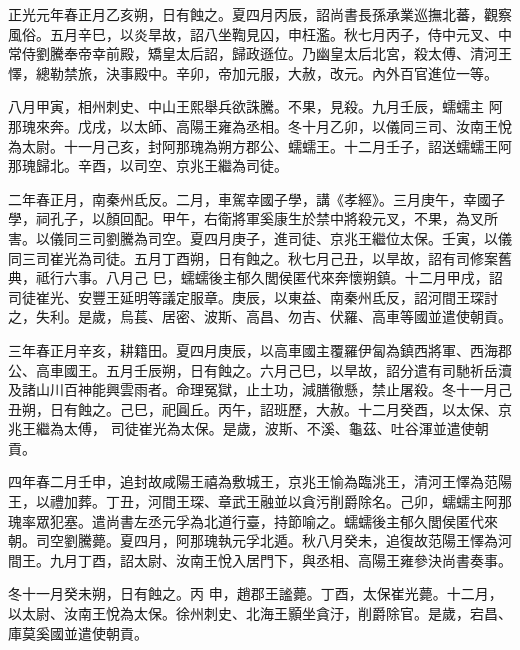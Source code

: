 \begin{pinyinscope}
 正光元年春正月乙亥朔，日有蝕之。夏四月丙辰，詔尚書長孫承業巡撫北蕃，觀察風俗。五月辛巳，以炎旱故，詔八坐鞫見囚，申枉濫。秋七月丙子，侍中元叉、中常侍劉騰奉帝幸前殿，矯皇太后詔，歸政遜位。乃幽皇太后北宮，殺太傅、清河王懌，總勒禁旅，決事殿中。辛卯，帝加元服，大赦，改元。內外百官進位一等。



 八月甲寅，相州刺史、中山王熙舉兵欲誅騰。不果，見殺。九月壬辰，蠕蠕主
 阿那瑰來奔。戊戌，以太師、高陽王雍為丞相。冬十月乙卯，以儀同三司、汝南王悅為太尉。十一月己亥，封阿那瑰為朔方郡公、蠕蠕王。十二月壬子，詔送蠕蠕王阿那瑰歸北。辛酉，以司空、京兆王繼為司徒。



 二年春正月，南秦州氐反。二月，車駕幸國子學，講《孝經》。三月庚午，幸國子學，祠孔子，以顏回配。甲午，右衛將軍奚康生於禁中將殺元叉，不果，為叉所害。以儀同三司劉騰為司空。夏四月庚子，進司徒、京兆王繼位太保。壬寅，以儀同三司崔光為司徒。五月丁酉朔，日有蝕之。秋七月己丑，以旱故，詔有司修案舊典，祗行六事。八月己
 巳，蠕蠕後主郁久閭侯匿代來奔懷朔鎮。十二月甲戌，詔司徒崔光、安豐王延明等議定服章。庚辰，以東益、南秦州氐反，詔河間王琛討之，失利。是歲，烏萇、居密、波斯、高昌、勿吉、伏羅、高車等國並遣使朝貢。



 三年春正月辛亥，耕籍田。夏四月庚辰，以高車國主覆羅伊匐為鎮西將軍、西海郡公、高車國王。五月壬辰朔，日有蝕之。六月己巳，以旱故，詔分遣有司馳祈岳瀆及諸山川百神能興雲雨者。命理冤獄，止土功，減膳徹懸，禁止屠殺。冬十一月己丑朔，日有蝕之。己巳，祀圓丘。丙午，詔班歷，大赦。十二月癸酉，以太保、京兆王繼為太傅，
 司徒崔光為太保。是歲，波斯、不溪、龜茲、吐谷渾並遣使朝貢。



 四年春二月壬申，追封故咸陽王禧為敷城王，京兆王愉為臨洮王，清河王懌為范陽王，以禮加葬。丁丑，河間王琛、章武王融並以貪污削爵除名。己卯，蠕蠕主阿那瑰率眾犯塞。遣尚書左丞元孚為北道行臺，持節喻之。蠕蠕後主郁久閭侯匿代來朝。司空劉騰薨。夏四月，阿那瑰執元孚北遁。秋八月癸未，追復故范陽王懌為河間王。九月丁酉，詔太尉、汝南王悅入居門下，與丞相、高陽王雍參決尚書奏事。



 冬十一月癸未朔，日有蝕之。丙
 申，趙郡王謐薨。丁酉，太保崔光薨。十二月，以太尉、汝南王悅為太保。徐州刺史、北海王顥坐貪汙，削爵除官。是歲，宕昌、庫莫奚國並遣使朝貢。




\end{pinyinscope}
